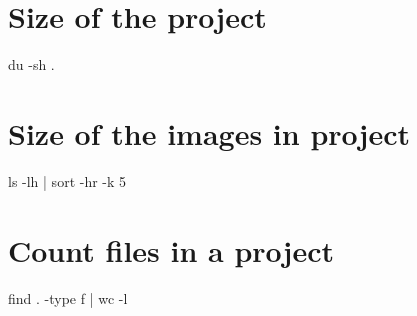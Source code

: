 \documentclass{article}
\begin{document}
\section{Size of the project}

\bash[stdout]
du -sh .
\END

\section{Size of the images in project}
\bash[stdout]
ls -lh | sort -hr -k 5
\END

\section{Count files in a project}
\bash[stdout]
find . -type f | wc -l
\END
\end{document}

